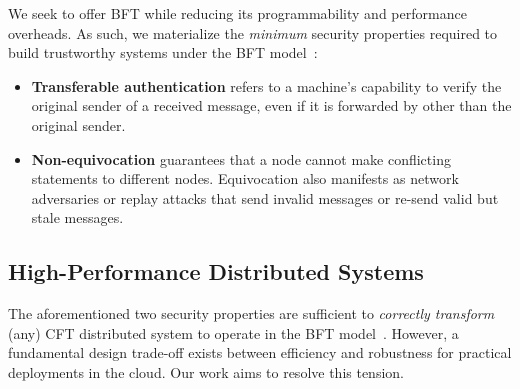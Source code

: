 


 We seek to offer BFT while reducing its programmability and performance overheads. As such, we materialize the {\em minimum} security properties required to build trustworthy systems under the BFT model~\cite{clement2012}: 
\begin{itemize}[leftmargin=*]
    \item {\bf Transferable authentication} refers to a machine's capability to verify the original sender of a received message, even if it is forwarded by other than the original sender. %
    \item {\bf Non-equivocation} guarantees that a node cannot make conflicting statements to different nodes. Equivocation also manifests as network adversaries or replay attacks that send invalid messages or re-send valid but stale messages.
\end{itemize}
\fi

\subsection{High-Performance Distributed Systems} \label{subsec::tees}
The aforementioned two security properties are sufficient to {\em correctly transform} (any) CFT distributed system to operate in the BFT model~\cite{clement2012, byzantine-pratical}. 
However, a fundamental design trade-off exists between efficiency and robustness for practical deployments in the cloud. Our work aims to resolve this tension.

